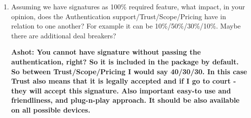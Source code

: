 \begin{enumerate}
    \item Assuming we have signatures as 100\% required feature, what impact, in your opinion, does the Authentication support/Trust/Scope/Pricing have in relation to one another? For example it can be 10\%/50\%/30\%/10\%. Maybe there are additional deal breakers?
    
    \textbf{Ashot: You cannot have signature without passing the authentication, right? So it is included in the package by default. So between Trust/Scope/Pricing I would say 40/30/30. In this case Trust also means that it is legally accepted and if I go to court - they will accept this signature.
    Also important easy-to use and friendliness, and plug-n-play approach. It should be also available on all possible devices.}
\end{enumerate}